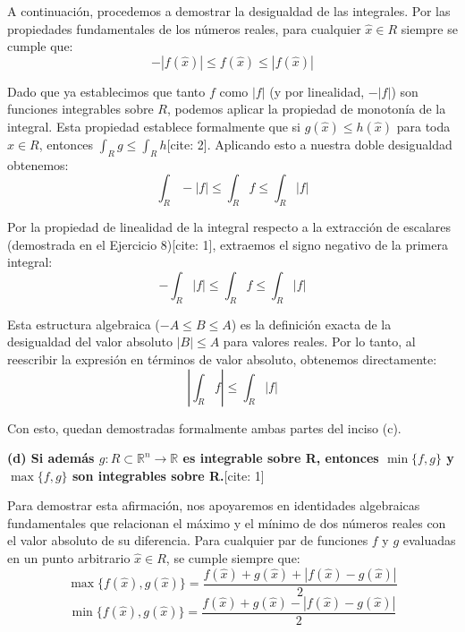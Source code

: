 \documentclass[11pt,letterpaper]{article}
\begin{document}
A continuación, procedemos a demostrar la desigualdad de las integrales. Por las propiedades fundamentales de los números reales, para cualquier $\hat{x} \in R$ siempre se cumple que:
\begin{equation*}
-|f(\hat{x})| \le f(\hat{x}) \le |f(\hat{x})|
\end{equation*}

Dado que ya establecimos que tanto $f$ como $|f|$ (y por linealidad, $-|f|$) son funciones integrables sobre $R$, podemos aplicar la propiedad de monotonía de la integral. Esta propiedad establece formalmente que si $g(\hat{x}) \le h(\hat{x})$ para toda $\hat{x} \in R$, entonces $\int_{R}g \le \int_{R}h$[cite: 2]. Aplicando esto a nuestra doble desigualdad obtenemos:
\begin{equation*}
\int_{R}-|f| \le \int_{R}f \le \int_{R}|f|
\end{equation*}

Por la propiedad de linealidad de la integral respecto a la extracción de escalares (demostrada en el Ejercicio 8)[cite: 1], extraemos el signo negativo de la primera integral:
\begin{equation*}
-\int_{R}|f| \le \int_{R}f \le \int_{R}|f|
\end{equation*}

Esta estructura algebraica ($-A \le B \le A$) es la definición exacta de la desigualdad del valor absoluto $|B| \le A$ para valores reales. Por lo tanto, al reescribir la expresión en términos de valor absoluto, obtenemos directamente:
\begin{equation*}
\left|\int_{R}f\right| \le \int_{R}|f|
\end{equation*}

Con esto, quedan demostradas formalmente ambas partes del inciso (c).

\textbf{(d) Si además $g:R\subset\mathbb{R}^{n}\rightarrow\mathbb{R}$ es integrable sobre R, entonces $\min\{f,g\}$ y $\max\{f,g\}$ son integrables sobre R.}[cite: 1]

Para demostrar esta afirmación, nos apoyaremos en identidades algebraicas fundamentales que relacionan el máximo y el mínimo de dos números reales con el valor absoluto de su diferencia. Para cualquier par de funciones $f$ y $g$ evaluadas en un punto arbitrario $\hat{x} \in R$, se cumple siempre que:
\begin{equation*}
\max\{f(\hat{x}), g(\hat{x})\} = \frac{f(\hat{x}) + g(\hat{x}) + |f(\hat{x}) - g(\hat{x})|}{2}
\end{equation*}
\begin{equation*}
\min\{f(\hat{x}), g(\hat{x})\} = \frac{f(\hat{x}) + g(\hat{x}) - |f(\hat{x}) - g(\hat{x})|}{2}
\end{equation*}
\end{document}

